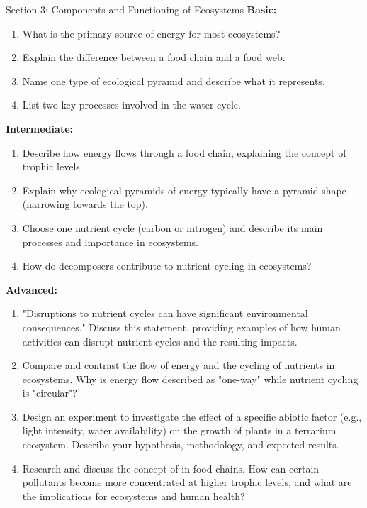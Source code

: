 \begin{tieredquestions}{Section 3: Components and Functioning of Ecosystems}
\textbf{Basic:}
\begin{enumerate}
    \item What is the primary source of energy for most ecosystems?
    \item Explain the difference between a food chain and a food web.
    \item Name one type of ecological pyramid and describe what it represents.
    \item List two key processes involved in the water cycle.
\end{enumerate}

\textbf{Intermediate:}
\begin{enumerate}
    \item Describe how energy flows through a food chain, explaining the concept of trophic levels.
    \item Explain why ecological pyramids of energy typically have a pyramid shape (narrowing towards the top).
    \item Choose one nutrient cycle (carbon or nitrogen) and describe its main processes and importance in ecosystems.
    \item How do decomposers contribute to nutrient cycling in ecosystems?
\end{enumerate}

\textbf{Advanced:}
\begin{enumerate}
    \item  "Disruptions to nutrient cycles can have significant environmental consequences." Discuss this statement, providing examples of how human activities can disrupt nutrient cycles and the resulting impacts.
    \item  Compare and contrast the flow of energy and the cycling of nutrients in ecosystems. Why is energy flow described as "one-way" while nutrient cycling is "circular"?
    \item  Design an experiment to investigate the effect of a specific abiotic factor (e.g., light intensity, water availability) on the growth of plants in a terrarium ecosystem. Describe your hypothesis, methodology, and expected results.
    \item  Research and discuss the concept of  in food chains. How can certain pollutants become more concentrated at higher trophic levels, and what are the implications for ecosystems and human health?
\end{enumerate}
\end{tieredquestions}


